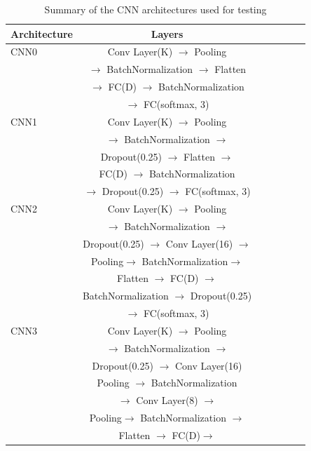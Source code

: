 \documentclass{article}
\begin{document}
\begin{table}[h!]
  \caption{Summary of the CNN architectures used for testing}
  \label{tab:format}
  \vskip 0.15in
  \begin{center}
 \begin{small}
 \begin{sc}
 \begin{tabular}{lcccccr}
 \hline
 \abovespace\belowspace
Architecture & Layers\\
\hline
\abovespace
CNN0 & Conv Layer(K) $\rightarrow$ Pooling\\
 &  $\rightarrow$ BatchNormalization $\rightarrow$ Flatten \\
 & $\rightarrow$ FC(D) $\rightarrow$ BatchNormalization \\
 \belowspace
 & $\rightarrow$ FC(softmax, 3)\\
\hline
\abovespace
CNN1 & Conv Layer(K) $\rightarrow$ Pooling \\
 & $\rightarrow$ BatchNormalization $\rightarrow$ \\
 & Dropout(0.25) $\rightarrow$ Flatten $\rightarrow$ \\
 & FC(D) $\rightarrow$ BatchNormalization\\
\belowspace
 & $\rightarrow$ Dropout(0.25) $\rightarrow$ FC(softmax, 3)\\
\hline
\abovespace
CNN2 & Conv Layer(K) $\rightarrow$ Pooling \\
 & $\rightarrow$ BatchNormalization $\rightarrow$ \\
 & Dropout(0.25) $\rightarrow$ Conv Layer(16) $\rightarrow$ \\
 & Pooling$\rightarrow$ BatchNormalization$\rightarrow$ \\
 & Flatten $\rightarrow$ FC(D) $\rightarrow$ \\
 & BatchNormalization $\rightarrow$ Dropout(0.25)\\
\belowspace
 &  $\rightarrow$ FC(softmax, 3)\\
\hline
\abovespace
CNN3 & Conv Layer(K) $\rightarrow$ Pooling \\
 & $\rightarrow$ BatchNormalization $\rightarrow$ \\
 & Dropout(0.25) $\rightarrow$ Conv Layer(16) \\
 & Pooling $\rightarrow$ BatchNormalization \\
 & $\rightarrow$ Conv Layer(8) $\rightarrow$ \\
 & Pooling$\rightarrow$ BatchNormalization $\rightarrow$ \\
 & Flatten $\rightarrow$ FC(D)$\rightarrow$ \\

\end{tabular}
\end{sc}
\end{small}
\end{center}
\end{table}
\end{document}
